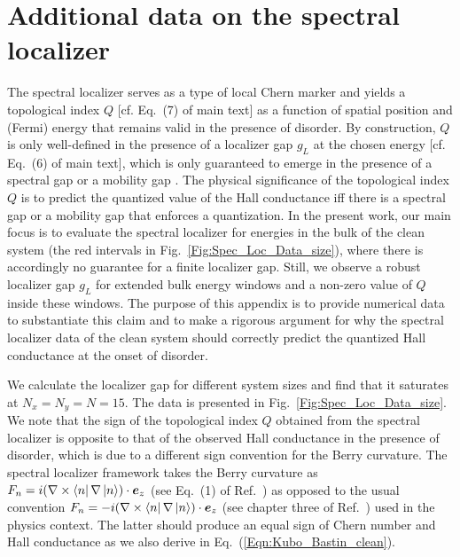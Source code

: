 \documentclass[aps,prb,amsmath,amssymb,twocolumn, superscriptaddress]{revtex4-2}
\newcommand{\BM}[1]{{\color{orange} #1}}
\newcommand{\eq}[1]{Eq.~(\ref{#1})}
\begin{document}
\section{Additional data on the spectral localizer}
\BM{The spectral localizer serves as a type of local Chern marker and yields a topological index $Q$ [cf. Eq.~(7) of main text] as a function of spatial position and (Fermi) energy that remains valid in the presence of disorder. By construction, $Q$ is only well-defined in the presence of a localizer gap $g_L$ at the chosen energy [cf. Eq.~(6) of main text], which is only guaranteed to emerge in the presence of a spectral gap \cite{Spec_loc_5_App} or a mobility gap \cite{spec_loc_mobility_gap_App}. The physical significance of the topological index $Q$ is to predict the quantized value of the Hall conductance iff there is a spectral gap or a mobility gap that enforces a quantization. In the present work, our main focus is to evaluate the spectral localizer for energies in the bulk of the clean system (the red intervals in Fig.~\ref{Fig:Spec_Loc_Data_size}), where there is accordingly no guarantee for a finite localizer gap. Still, we observe a robust localizer gap $g_L$ for extended bulk energy windows and a non-zero value of $Q$ inside these windows. The purpose of this appendix is to provide numerical data to substantiate this claim and to make a rigorous argument for why the spectral localizer data of the clean system should correctly predict the quantized Hall conductance at the onset of disorder.}

We calculate the localizer gap for different system sizes and find that it saturates at $N_x  = N_y = N = 15$. The data is presented in Fig.~\ref{Fig:Spec_Loc_Data_size}. We note that the sign of the topological index $Q$ obtained from the spectral localizer is opposite to that of the observed Hall conductance in the presence of disorder, which is due to a different sign convention for the Berry curvature. The spectral localizer framework takes the Berry curvature as $F_n = i (\nabla \times \bra{n} \nabla \ket{n}) \cdot \bm e_z$ (see Eq.~(1) of Ref.~\cite{Spec_loc_5_App}) as opposed to the usual convention $F_n = -i (\nabla \times \bra{n} \nabla \ket{n} ) \cdot \bm e_z$ (see chapter three of Ref.~\cite{Bernevig_App}) used in the physics context. The latter should produce an equal sign of Chern number and Hall conductance as we also derive in \eq{Eqn:Kubo_Bastin_clean}. 
\end{document}
